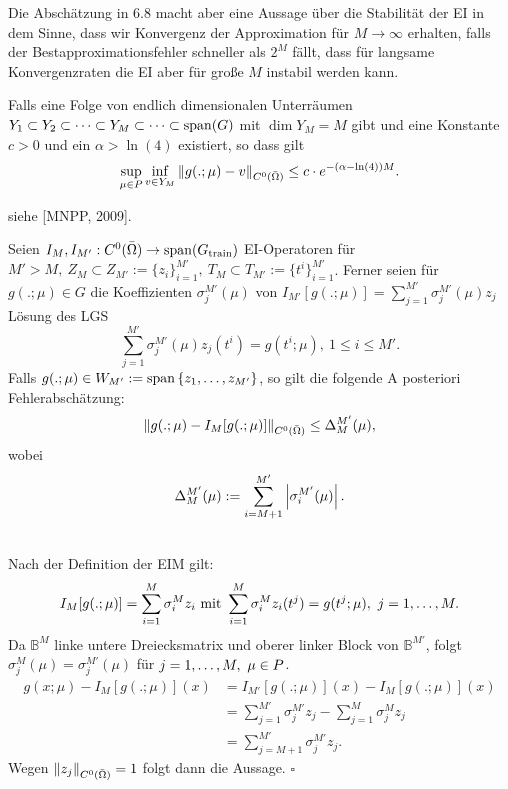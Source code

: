 Die Abschätzung in 6.8 macht aber eine Aussage über die Stabilität der EI in dem Sinne, dass wir Konvergenz der Approximation für $M\to \infty$ erhalten, falls der Bestapproximationsfehler schneller als $2^M$ fällt, dass für langsame Konvergenzraten die EI aber für große $M$ instabil werden kann.

Falls eine Folge von endlich dimensionalen Unterräumen $Y_1\subset Y_2\subset \dots \subset
Y_M\subset \dots \subset \operatorname{span}(G)$ mit $\dim Y_M=M$ gibt und eine Konstante $c>0$ und ein $\alpha>\ln(4)$ existiert, so dass gilt
\[
\sup\limits_{\mu\in P} \inf\limits_{v\in Y_M} \left\Vert g(.;\mu) -v\right\Vert_{C^0(\bar{\Omega})} \le c\cdot e^{-(\alpha-\ln(4))M}.
\]

 siehe [MNPP, 2009].

Seien $I_M,I_{M'}:C^0(\bar{\Omega}) \to \operatorname{span}(G_{\operatorname{train}})$ EI-Operatoren für $M'>M,~ Z_M\subset Z_{M'}:=\{z_i\}_{i=1}^{M'},~T_M\subset T_{M'}:= \{t^i\}_{i=1}^{M'}$.
Ferner seien für $g(.;\mu)\in G$ die Koeffizienten $\sigma_j^{M'}(\mu)$ von $I_{M'}[g(.;\mu)]= \sum_{j=1}^{M'} \sigma_j^{M'}(\mu)z_j$ Lösung des LGS
\[
\sum_{j=1}^{M'} \sigma_j^{M'}(\mu) z_j(t^i)= g(t^i;\mu),~ 1\le i\le M'.
\]
Falls $g(.;\mu)\in W_{M'} := \operatorname{span} \left\{z_1, \dots ,z_{M'}\right\}$, so gilt die folgende A posteriori Fehlerabschätzung:
\begin{align}
\left\Vert g(.;\mu) - I_M[g(.;\mu)]\right\Vert_{C^0(\bar{\Omega})} \le \Delta_M^{M'}(\mu),
\end{align}
wobei
\begin{align}
\Delta_M^{M'}(\mu):= \sum_{i=M+1}^{M'} \left\vert\sigma_i^{M'}(\mu)\right\vert.
\end{align}

\\
Nach der Definition der EIM gilt:
\[
I_M[g(.;\mu)] = \sum_{i=1}^M \sigma_i^Mz_i \text{ mit } \sum_{i=1}^M \sigma_i^Mz_i(t^j) = g(t^j;\mu),~j = 1, \dots ,M.
\]
Da $\mathbb{B}^M$ linke untere Dreiecksmatrix und oberer linker Block von $\mathbb{B}^{M'}$, folgt $\sigma_j^M(\mu) = \sigma_j^{M'}(\mu)$ für $j=1, \dots ,M,~\mu\in P$.
\begin{align*}
g(x;\mu) - I_M[g(.;\mu)](x) &= I_{M'}[g(.;\mu)](x) - I_M[g(.;\mu)](x)\\
&= \sum_{j=1}^{M'} \sigma_j^{M'}z_j - \sum_{j=1}^M \sigma_j^M z_j\\
&= \sum_{j=M+1}^{M'} \sigma_j^{M'}z_j.
\end{align*}
Wegen $\left\Vert z_j\right\Vert_{C^0(\bar{\Omega})}=1$ folgt dann die Aussage.
\hfill $\square$

